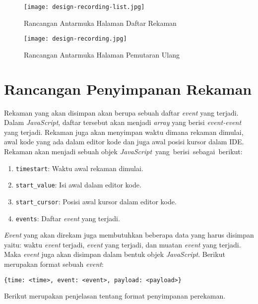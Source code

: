 \begin{figure}[H]
    \centering
    \texttt{[image: design-recording-list.jpg]}
    \caption{Rancangan Antarmuka Halaman Daftar Rekaman}
    \label{fig:4:1:listrec}
\end{figure}

\begin{figure}[H]
    \centering
    \texttt{[image: design-recording.jpg]}
    \caption{Rancangan Antarmuka Halaman Pemutaran Ulang}
    \label{fig:4:1:rec}
\end{figure}

\section{Rancangan Penyimpanan Rekaman}
\label{sec:4:2:storerekaman}

Rekaman yang akan disimpan akan berupa sebuah daftar \textit{event} yang terjadi. Dalam \textit{JavaScript}, daftar tersebut akan menjadi \textit{array} yang berisi \textit{event-event} yang terjadi. Rekaman juga akan menyimpan waktu dimana rekaman dimulai, awal kode yang ada dalam editor kode dan juga awal posisi kursor dalam IDE. Rekaman akan menjadi sebuah objek \mbox{\textit{JavaScript} yang berisi sebagai berikut:}

\begin{enumerate}
    \item \verb|timestart|: Waktu awal rekaman dimulai.
    \item \verb|start_value|: Isi awal dalam editor kode.
    \item \verb|start_cursor|: Posisi awal kursor dalam editor kode.
    \item \verb|events|: Daftar \textit{event} yang terjadi.
\end{enumerate}

\textit{Event} yang akan direkam juga membutuhkan beberapa data yang harus disimpan yaitu: waktu \textit{event} terjadi, \textit{event} yang terjadi, dan muatan \textit{event} yang terjadi. Maka \textit{event} juga akan disimpan dalam bentuk objek \textit{JavaScript}. Berikut merupakan format sebuah \textit{event}:

\begin{center}
    \verb|{time: <time>, event: <event>, payload: <payload>}|
\end{center}

Berikut merupakan penjelasan tentang format penyimpanan perekaman.

